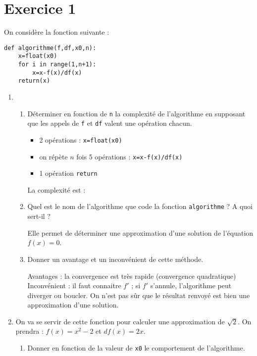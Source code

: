 \documentclass[a4paper,12pt]{article}
\begin{document}
\section*{Exercice 1}
\noi On considère la fonction suivante :
\begin{verbatim}
def algorithme(f,df,x0,n):
    x=float(x0)
    for i in range(1,n+1):
        x=x-f(x)/df(x)
    return(x) 
\end{verbatim}
\begin{enumerate}
\item \begin{enumerate}
\item Déterminer en fonction de \verb?n? la complexité de l'algorithme en supposant que les appels de \verb?f? et \verb?df? valent une opération chacun.
\begin{solution}
\begin{itemize}
\item 2 opérations : \verb?x=float(x0)?
\item on répète $n$ fois 5 opérations : \verb?x=x-f(x)/df(x)?
\item 1 opération \verb?return?
\end{itemize}
La complexité est : 
\end{solution}
\item Quel est le nom de l'algorithme que code la fonction \verb?algorithme? ? A quoi sert-il ?
\begin{solution}
 Elle permet de déterminer une approximation d'une solution de l'équation $f(x)=0$.
\end{solution}
\item Donner un avantage et un inconvénient de cette méthode.
\begin{solution}
Avantages : la convergence est très rapide (convergence quadratique)
Inconvénient : il faut connaitre $f'$ ; si $f'$ s'annule, l'algorithme peut diverger ou boucler. On n'est pas sûr que le résultat renvoyé est bien une approximation d'une solution.
\end{solution}
\end{enumerate}
\item On va se servir de cette fonction pour calculer une approximation de $\sqrt{2}$. On prendra : $f(x)=x^2-2$ et $df(x)=2x$.
\begin{enumerate}
\item Donner en fonction de la valeur de \verb?x0? le comportement de l'algorithme.
\begin{solution}

\end{solution}
\end{enumerate}
\end{enumerate}
\end{document}
